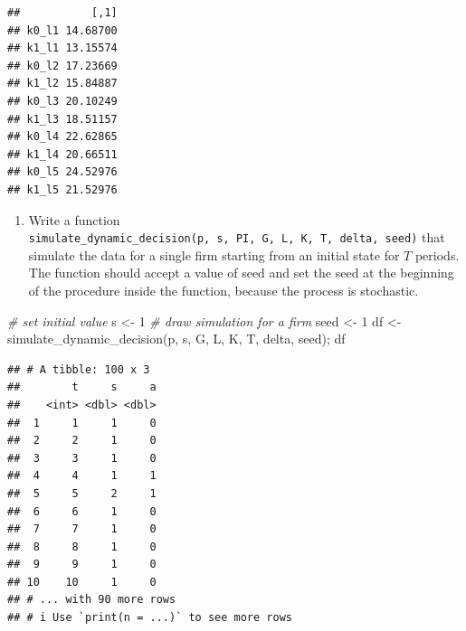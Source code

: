 \documentclass[
]{book}
\newenvironment{Shaded}{\begin{snugshade}}{\end{snugshade}}
\newcommand{\CommentTok}[1]{\textcolor[rgb]{0.56,0.35,0.01}{\textit{#1}}}
\newcommand{\DecValTok}[1]{\textcolor[rgb]{0.00,0.00,0.81}{#1}}
\newcommand{\FunctionTok}[1]{\textcolor[rgb]{0.00,0.00,0.00}{#1}}
\newcommand{\NormalTok}[1]{#1}
\newcommand{\OtherTok}[1]{\textcolor[rgb]{0.56,0.35,0.01}{#1}}
\newcommand{\SpecialCharTok}[1]{\textcolor[rgb]{0.00,0.00,0.00}{#1}}
\providecommand{\tightlist}{%
  \setlength{\itemsep}{0pt}\setlength{\parskip}{0pt}}
\begin{document}
\begin{Shaded}
\end{Shaded}

\begin{verbatim}
##           [,1]
## k0_l1 14.68700
## k1_l1 13.15574
## k0_l2 17.23669
## k1_l2 15.84887
## k0_l3 20.10249
## k1_l3 18.51157
## k0_l4 22.62865
## k1_l4 20.66511
## k0_l5 24.52976
## k1_l5 21.52976
\end{verbatim}

\begin{enumerate}
\def\labelenumi{\arabic{enumi}.}
\setcounter{enumi}{5}
\tightlist
\item
  Write a function \texttt{simulate\_dynamic\_decision(p,\ s,\ PI,\ G,\ L,\ K,\ T,\ delta,\ seed)} that simulate the data for a single firm starting from an initial state for \(T\) periods. The function should accept a value of seed and set the seed at the beginning of the procedure inside the function, because the process is stochastic.
\end{enumerate}

\begin{Shaded}
\begin{Highlighting}[]
\CommentTok{\# set initial value}
\NormalTok{s }\OtherTok{\textless{}{-}} \DecValTok{1}
\CommentTok{\# draw simulation for a firm}
\NormalTok{seed }\OtherTok{\textless{}{-}} \DecValTok{1}
\NormalTok{df }\OtherTok{\textless{}{-}} \FunctionTok{simulate\_dynamic\_decision}\NormalTok{(p, s, G, L, K, T, delta, seed); df}
\end{Highlighting}
\end{Shaded}

\begin{verbatim}
## # A tibble: 100 x 3
##        t     s     a
##    <int> <dbl> <dbl>
##  1     1     1     0
##  2     2     1     0
##  3     3     1     0
##  4     4     1     1
##  5     5     2     1
##  6     6     1     0
##  7     7     1     0
##  8     8     1     0
##  9     9     1     0
## 10    10     1     0
## # ... with 90 more rows
## # i Use `print(n = ...)` to see more rows
\end{verbatim}
\end{document}
